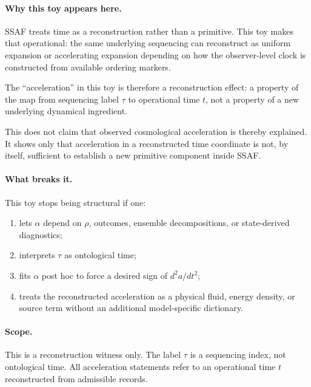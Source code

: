 \documentclass[aps,prx,onecolumn,11pt]{revtex4-2}
\theoremstyle{plain}
\theoremstyle{definition}
\theoremstyle{remark}
\begin{document}
\paragraph{Why this toy appears here.}

SSAF treats time as a reconstruction rather than a primitive. This toy
makes that operational: the same underlying sequencing can reconstruct
as uniform expansion or accelerating expansion depending on how the
observer-level clock is constructed from available ordering markers.

The ``acceleration'' in this toy is therefore a reconstruction effect:
a property of the map from sequencing label \(\tau\) to operational time
\(t\), not a property of a new underlying dynamical ingredient.

This does not claim that observed cosmological acceleration is thereby
explained. It shows only that acceleration in a reconstructed time
coordinate is not, by itself, sufficient to establish a new primitive
component inside SSAF.

\paragraph{What breaks it.}

This toy stops being structural if one:

\begin{enumerate}[label=(\roman*), leftmargin=2.2em]

\item lets \(\alpha\) depend on \(\rho\), outcomes, ensemble
decompositions, or state-derived diagnostics;

\item interprets \(\tau\) as ontological time;

\item fits \(\alpha\) post hoc to force a desired sign of
\(d^2a/dt^2\);

\item treats the reconstructed acceleration as a physical fluid,
energy density, or source term without an additional model-specific
dictionary.

\end{enumerate}

\paragraph{Scope.}

This is a reconstruction witness only. The label \(\tau\) is a
sequencing index, not ontological time. All acceleration statements
refer to an operational time \(t\) reconstructed from admissible
records.
\end{document}
